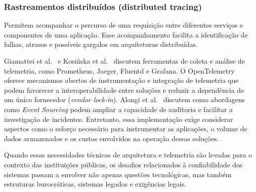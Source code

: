\begin{samepage}
\subsubsection{Rastreamentos distribuídos (distributed tracing)}\label{sec:rastreamentos}

Permitem acompanhar o
percurso de uma requisição entre diferentes serviços e componentes de uma aplicação. Esse
acompanhamento facilita a identificação de falhas, atrasos e possíveis gargalos em
arquiteturas distribuídas.
\par
\end{samepage}

Giamattei et al.~ e Kosińska et al.~
discutem ferramentas de coleta e análise de telemetria, como Prometheus, Jaeger, Fluentd
e Grafana. O OpenTelemetry oferece mecanismos abertos de instrumentação e integração
de telemetria que podem favorecer a interoperabilidade entre soluções e reduzir a
dependência de um único fornecedor (\emph{vendor lock-in}). Alongi et
al.~ discutem como abordagens como \emph{Event Sourcing} podem
ampliar a capacidade de auditoria e facilitar a investigação de incidentes. Entretanto, essa implementação exige considerar aspectos
como o esforço necessário para instrumentar as aplicações, o volume de dados armazenados e
os custos envolvidos na operação dessas soluções.

Quando essas necessidades técnicas de arquitetura e telemetria são levadas para o contexto
das instituições públicas, os desafios relacionados à confiabilidade dos sistemas passam a
envolver não apenas questões tecnológicas, mas também estruturas burocráticas, sistemas
legados e exigências legais.
